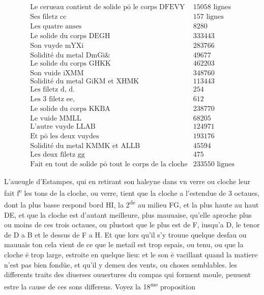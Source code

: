 \documentclass[11pt,a4paper]{article}
\begin{document}
\[
\begin{array}{lr}
\text{Le cerueau contient de solide pō le corps DFEVY} & 15058 \text{ lignes} \\
\text{Ses filetz cc} & 157 \text{ lignes} \\
\text{Les quatre anses} & 8280 \\
\text{Le solide du corps DEGH} & 333443 \\
\text{Son vuyde mYXi} & 283766 \\
\text{Solidité du metal DmGi\&} & 49677 \\
\text{Le solide du corps GHKK} & 462203 \\
\text{Son vuide iXMM} & 348760 \\
\text{Solidité du metal GiKM et XHMK} & 113443 \\
\text{Les filetz d, d.} & 254 \\
\text{Les 3 filetz ee,} & 612 \\
\text{Le solide du corps KKBA} & 238770 \\
\text{Le vuide MMLL} & 68205 \\
\text{L'autre vuyde LLAB} & 124971 \\
\text{Et pō les deux vuydes} & 193176 \\
\text{Solidité du metal KMMK et ALLB} & 45594 \\
\text{Les deux filetz gg} & 475 \\
\text{Fait en tout de solide pō tout le corps de la cloche} & 233550 \text{ lignes}
\end{array}
\]

L'aueugle d'Estampes, qui en retirant son haleyne dans vn verre ou cloche leur fait f\textsuperscript{e} les \ill{} tons de la cloche, ou verre, tient que la cloche a l'estendue de 3 octaues, dont la plus basse respond  bord HI, la 2\textsuperscript{de} au milieu FG, et la plus haute au haut DE, et que la cloche est d'autant meilleure, \ill{} plus mauuaise, qu'elle aproche plus ou moins de ces trois octaues, ou plustost que le plus \struck{\ill{}}  est de \ill{} F, iusqu'a D, le tenor de D a B et le dessus de F a H. Et que lors qu'il s'y trouue quelque desfau ou mauuais ton cela vient de ce que le metail est trop espais, ou tenu, ou que la cloche ē trop large, \ill{} estroite en quelque lieu: et le son ē vacillant quand la matiere n'est pas bien fondüe, et qu'il y demeu des vents, ou choses semblables. les differents traits des diuerses ouuertures du compas qui forment \ill{} moule, peuuent estre la cause de ces sons differens. Voyez la 18\textsuperscript{me} proposition
\end{document}

